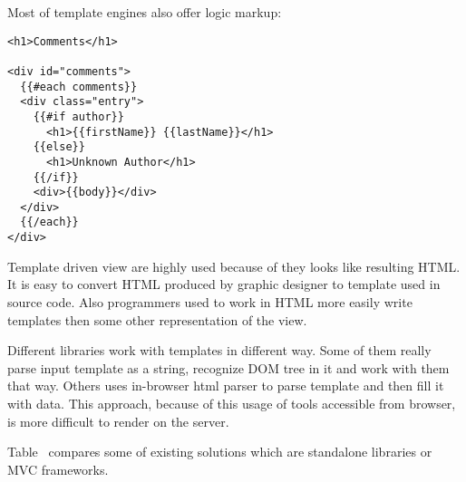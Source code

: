 \documentclass[oneside, 12pt]{book}
\begin{document}


	Most of template engines also offer logic markup:
\begin{verbatim}
<h1>Comments</h1>

<div id="comments">
  {{#each comments}}
  <div class="entry">
    {{#if author}}
      <h1>{{firstName}} {{lastName}}</h1>
    {{else}}
      <h1>Unknown Author</h1>
    {{/if}}
    <div>{{body}}</div>
  </div>
  {{/each}}
</div>

\end{verbatim}



	Template driven view are highly used because of they looks like resulting HTML. 
	It is easy to convert HTML produced by graphic designer to template used in source code. 
	Also programmers used to work in HTML more easily write templates then some other representation of the view.

	Different libraries work with templates in different way. 
	Some of them really parse input template as a string, recognize DOM tree in it and work with them that way.
	Others uses in-browser html parser to parse template and then fill it with data.
	This approach, because of this usage of tools accessible from browser, is more difficult to render on the server.

	Table~ compares some of existing solutions which are standalone libraries or MVC frameworks.
\end{document}
